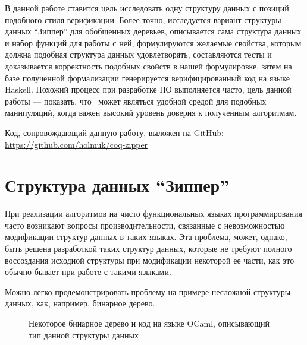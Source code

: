 В данной работе ставится цель исследовать одну структуру данных с позиций подобного стиля верификации. Более точно, исследуется вариант структуры данных ``Зиппер'' для обобщенных деревьев, описывается сама структура данных и набор функций для работы с ней, формулируются желаемые свойства, которым должна подобная структура данных удовлетворять, составляются тесты и доказывается корректность подобных свойств в нашей формулировке, затем на базе полученной формализации генерируется верифицированный код на языке Haskell. Похожий процесс при разработке ПО выполняется часто, цель данной работы --- показать, что \tcoq~может являться удобной средой для подобных манипуляций, когда важен высокий уровень доверия к полученным алгоритмам.

Код, сопровождающий данную работу, выложен на GitHub: \url{https://github.com/holmuk/coq-zipper}

\newpage

\section{Структура данных ``Зиппер''}

При реализации алгоритмов на чисто функциональных языках программирования часто возникают вопросы производительности, связанные с невозможностью модификации структур данных в таких языках. Эта проблема, может, однако, быть решена разработкой таких структур данных, которые не требуют полного воссоздания исходной структуры при модификации некоторой ее части, как это обычно бывает при работе с такими языками.

Можно легко продемонстрировать проблему на примере несложной структуры данных, как, например, бинарное дерево. 

\begin{figure}[H]
\centering


\caption{Некоторое бинарное дерево и код на языке OCaml, описывающий тип данной структуры данных}
\end{figure}

